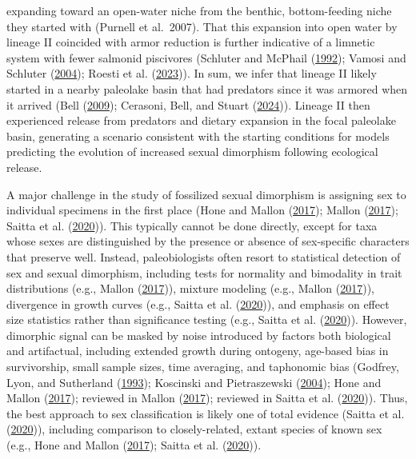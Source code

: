 \documentclass[
  12pt,
]{article}
\begin{document}
expanding toward an open-water niche from the benthic, bottom-feeding
niche they started with (Purnell et al.~2007). That this expansion into
open water by lineage II coincided with armor reduction is further
indicative of a limnetic system with fewer salmonid piscivores (Schluter
and McPhail (\protect\hyperlink{ref-SchluterandMcPhail1992}{1992});
Vamosi and Schluter
(\protect\hyperlink{ref-VamosiandSchluter2004}{2004}); Roesti et al.
(\protect\hyperlink{ref-Roestietal2023}{2023})). In sum, we infer that
lineage II likely started in a nearby paleolake basin that had predators
since it was armored when it arrived (Bell
(\protect\hyperlink{ref-Bell2009}{2009}); Cerasoni, Bell, and Stuart
(\protect\hyperlink{ref-Cerasonietal2024}{2024})). Lineage II then
experienced release from predators and dietary expansion in the focal
paleolake basin, generating a scenario consistent with the starting
conditions for models predicting the evolution of increased sexual
dimorphism following ecological release.

A major challenge in the study of fossilized sexual dimorphism is
assigning sex to individual specimens in the first place (Hone and
Mallon (\protect\hyperlink{ref-HoneandMallon2017}{2017}); Mallon
(\protect\hyperlink{ref-Mallon2017}{2017}); Saitta et al.
(\protect\hyperlink{ref-Saittaetal2020}{2020})). This typically cannot
be done directly, except for taxa whose sexes are distinguished by the
presence or absence of sex-specific characters that preserve well.
Instead, paleobiologists often resort to statistical detection of sex
and sexual dimorphism, including tests for normality and bimodality in
trait distributions (e.g., Mallon
(\protect\hyperlink{ref-Mallon2017}{2017})), mixture modeling (e.g.,
Mallon (\protect\hyperlink{ref-Mallon2017}{2017})), divergence in growth
curves (e.g., Saitta et al.
(\protect\hyperlink{ref-Saittaetal2020}{2020})), and emphasis on effect
size statistics rather than significance testing (e.g., Saitta et al.
(\protect\hyperlink{ref-Saittaetal2020}{2020})). However, dimorphic
signal can be masked by noise introduced by factors both biological and
artifactual, including extended growth during ontogeny, age-based bias
in survivorship, small sample sizes, time averaging, and taphonomic bias
(Godfrey, Lyon, and Sutherland
(\protect\hyperlink{ref-Godfreyetal1993}{1993}); Koscinski and
Pietraszewski
(\protect\hyperlink{ref-KoscinskiandPietraszewski2004}{2004}); Hone and
Mallon (\protect\hyperlink{ref-HoneandMallon2017}{2017}); reviewed in
Mallon (\protect\hyperlink{ref-Mallon2017}{2017}); reviewed in Saitta et
al. (\protect\hyperlink{ref-Saittaetal2020}{2020})). Thus, the best
approach to sex classification is likely one of total evidence (Saitta
et al. (\protect\hyperlink{ref-Saittaetal2020}{2020})), including
comparison to closely-related, extant species of known sex (e.g., Hone
and Mallon (\protect\hyperlink{ref-HoneandMallon2017}{2017}); Saitta et
al. (\protect\hyperlink{ref-Saittaetal2020}{2020})).
\end{document}
